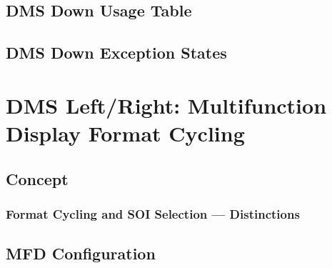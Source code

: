 \documentclass[11pt, a4paper, twoside]{report}
\begin{document}
\subsection{DMS Down Usage Table}
\label{sec:C3-S3-S2}

\subsection{DMS Down Exception States}
\label{sec:C3-S3-S3}

\section{DMS Left/Right: Multifunction Display Format Cycling}
\label{sec:C3-S4}

\subsection{Concept}
\label{sec:C3-S4-S1}

\subsubsection{Format Cycling and SOI Selection --- Distinctions}
\label{sec:C3-S4-S1-S1}

\subsection{MFD Configuration}
\label{sec:C3-S4-S2}
\end{document}
